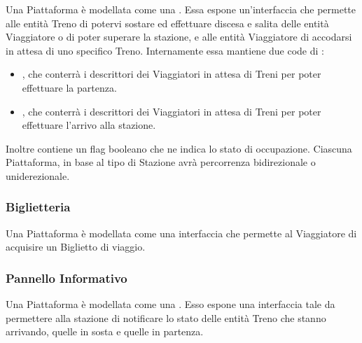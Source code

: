 		Una Piattaforma è modellata come una . Essa espone un'interfaccia che permette alle entità Treno di potervi sostare ed effettuare discesa e salita delle entità Viaggiatore o di poter superare la stazione, e alle entità Viaggiatore di accodarsi in attesa di uno specifico Treno.
		Internamente essa mantiene due code di :
		\begin{itemize}
			\item {}, che conterrà i descrittori dei Viaggiatori in attesa di Treni per poter effettuare la partenza.
			\item {}, che conterrà i descrittori dei Viaggiatori in attesa di Treni per poter effettuare l'arrivo alla stazione.
		\end{itemize}
		Inoltre contiene un flag booleano  che ne indica lo stato di occupazione.
		Ciascuna Piattaforma, in base al tipo di Stazione avrà percorrenza bidirezionale o uniderezionale.
				
		\subsubsection{Biglietteria}
		
		Una Piattaforma è modellata come una interfaccia che permette al Viaggiatore di acquisire un Biglietto di viaggio. 
		
		\subsubsection{Pannello Informativo}
		
		Una Piattaforma è modellata come una . Esso espone una interfaccia tale da permettere alla stazione di notificare lo stato delle entità Treno che stanno arrivando, quelle in sosta e quelle in partenza.
\newpage
